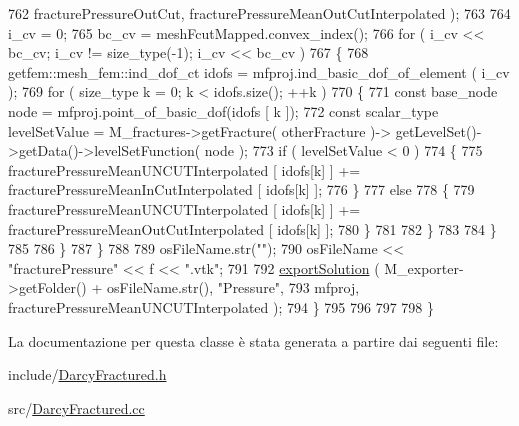 \begin{DoxyCode}
762                                         fracturePressureOutCut, fracturePressureMeanOutCutInterpolated );
763 
764                 i\_cv = 0;
765                 bc\_cv = meshFcutMapped.convex\_index();
766                 \textcolor{keywordflow}{for} ( i\_cv << bc\_cv; i\_cv != size\_type(-1); i\_cv << bc\_cv )
767                 \{
768                     getfem::mesh\_fem::ind\_dof\_ct idofs = mfproj.ind\_basic\_dof\_of\_element ( i\_cv );
769                     \textcolor{keywordflow}{for} ( size\_type k = 0; k < idofs.size(); ++k )
770                     \{
771                         \textcolor{keyword}{const} base\_node node = mfproj.point\_of\_basic\_dof(idofs [ k ]);
772                         \textcolor{keyword}{const} scalar\_type levelSetValue = M\_fractures->getFracture( otherFracture )->
      getLevelSet()->getData()->levelSetFunction( node );
773                         \textcolor{keywordflow}{if} ( levelSetValue < 0 )
774                         \{
775                             fracturePressureMeanUNCUTInterpolated [ idofs[k] ] += 
      fracturePressureMeanInCutInterpolated [ idofs[k] ];
776                         \}
777                         \textcolor{keywordflow}{else}
778                         \{
779                             fracturePressureMeanUNCUTInterpolated [ idofs[k] ] += 
      fracturePressureMeanOutCutInterpolated [ idofs[k] ];
780                         \}
781 
782                     \}
783 
784                 \}
785 
786             \}
787         \}
788 
789         osFileName.str(\textcolor{stringliteral}{""});
790         osFileName << \textcolor{stringliteral}{"fracturePressure"} << f << \textcolor{stringliteral}{".vtk"};
791 
792         \hyperlink{UsefulFunctions_8h_add7b8b88dc68d93addd88b9a4dc6e8bf}{exportSolution} ( M\_exporter->getFolder() + osFileName.str(), \textcolor{stringliteral}{"Pressure"},
793                      mfproj, fracturePressureMeanUNCUTInterpolated );
794     \}
795 
796    
797    
798 \}\end{DoxyCode}


La documentazione per questa classe è stata generata a partire dai seguenti file\-:\begin{DoxyCompactItemize}
\item 
include/\hyperlink{DarcyFractured_8h}{Darcy\-Fractured.\-h}\item 
src/\hyperlink{DarcyFractured_8cc}{Darcy\-Fractured.\-cc}\end{DoxyCompactItemize}
